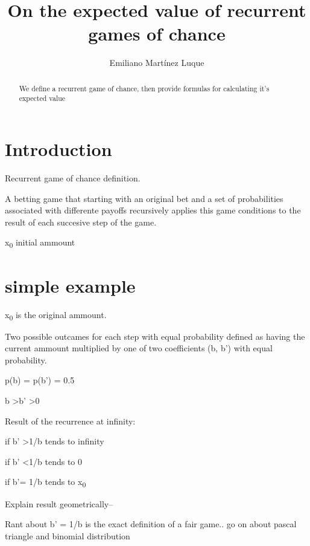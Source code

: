 \documentclass[12pt,reqno]{amsart}
\begin{document}
\title[On the expected value of recurrent games of chance]{On the expected value of recurrent games of chance}
\author{Emiliano Martínez Luque}
\maketitle

\begin{abstract}
We define a recurrent game of chance, then provide formulas for calculating it's expected value
\end{abstract}

\section{Introduction}
\label{first section}

Recurrent game of chance definition.

A betting game that starting with an original bet and a set of probabilities associated with differente payoffs recursively applies this game conditions to the result of each succesive step of the game.

x\textsubscript{0} initial ammount

\section{simple example}

x\textsubscript{0} is the original ammount.

Two possible outcames for each step with equal probability defined as having the current ammount multiplied by one of two coefficients (b, b') with equal probability.

p(b) = p(b') = 0.5

b \textgreater b' \textgreater 0



Result of the recurrence at infinity:

if b' \textgreater 1/b tends to infinity

if b' \textless 1/b tends to 0

if b'= 1/b tends to x\textsubscript{0}



Explain result geometrically--

Rant about b' = 1/b is the exact definition of a fair game.. go on about pascal triangle and binomial distribution
\end{document}
